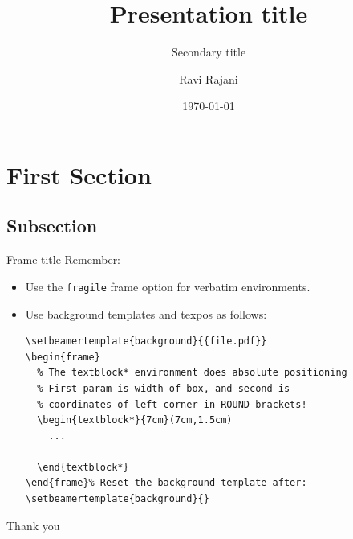 \documentclass{slides} %
\title
{Presentation title}
\subtitle
{Secondary title}
\author
{Ravi Rajani}
\institute
{School of Computing and Communications}
\date{\today}
\begin{document}
\begin{frame}
  \titlepage
\end{frame}


\section{First Section}

\subsection{Subsection}

\begin{frame}[fragile]{Frame title}
    Remember:
    \begin{itemize}[<+->]
      \item Use the \texttt{fragile} frame option for verbatim environments.
      \item Use background templates and texpos as follows:
            \begin{verbatim}
\setbeamertemplate{background}{{file.pdf}}
\begin{frame}
  % The textblock* environment does absolute positioning
  % First param is width of box, and second is
  % coordinates of left corner in ROUND brackets!
  \begin{textblock*}{7cm}(7cm,1.5cm)
    ...
    
  \end{textblock*}
\end{frame}% Reset the background template after:
\setbeamertemplate{background}{}
\end{verbatim}
    \end{itemize}
\end{frame}

\begin{frame}
  \nointerlineskip%
  \vspace{\titletopmargin}
  \begin{minipage}[c][\dimexpr \titleboxheight - .8cm\relax][c]{\textwidth}\raggedright
    Thank you%
  \end{minipage}
  \begin{minipage}[c][.8cm][b]{\textwidth}
    \inserttitlegraphic%
  \end{minipage}
\end{frame}
\end{document}
